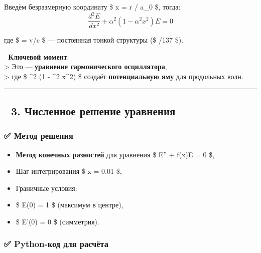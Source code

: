 \documentclass[11pt]{article}
\providecommand{\tightlist}{%
      \setlength{\itemsep}{0pt}\setlength{\parskip}{0pt}}
\begin{document}
Введём безразмерную координату \$ x = r / a\_0 \$, тогда: \[
\boxed{
\frac{d^2 E}{dx^2} + \alpha^2 \left( 1 - \alpha^2 x^2 \right) E = 0
}
\]

где \$ \alpha = v/c \$ --- постоянная тонкой структуры (\$
\alpha {}/137 \$).

📌 \textbf{Ключевой момент}:\\
\textgreater{} Это --- \textbf{уравнение гармонического осциллятора},\\
\textgreater{} где \$ \alpha\^{}2 (1 - \alpha\^{}2 x\^{}2) \$ создаёт
\textbf{потенциальную яму} для продольных волн.

\begin{center}\rule{0.5\linewidth}{\linethickness}\end{center}

\subsection{🔹 3. Численное решение
уравнения}\label{ux447ux438ux441ux43bux435ux43dux43dux43eux435-ux440ux435ux448ux435ux43dux438ux435-ux443ux440ux430ux432ux43dux435ux43dux438ux44f}

\subsubsection{✅ Метод
решения}\label{ux43cux435ux442ux43eux434-ux440ux435ux448ux435ux43dux438ux44f}

\begin{itemize}
\tightlist
\item
  \textbf{Метод конечных разностей} для уравнения \$ E'' + f(x)E = 0 \$,
\item
  Шаг интегрирования \$ \Delta x = 0.01 \$,
\item
  Граничные условия:\\
\item
  \$ E(0) = 1 \$ (максимум в центре),\\
\item
  \$ E'(0) = 0 \$ (симметрия).
\end{itemize}

\subsubsection{✅ Python-код для
расчёта}\label{python-ux43aux43eux434-ux434ux43bux44f-ux440ux430ux441ux447ux451ux442ux430}
\end{document}
